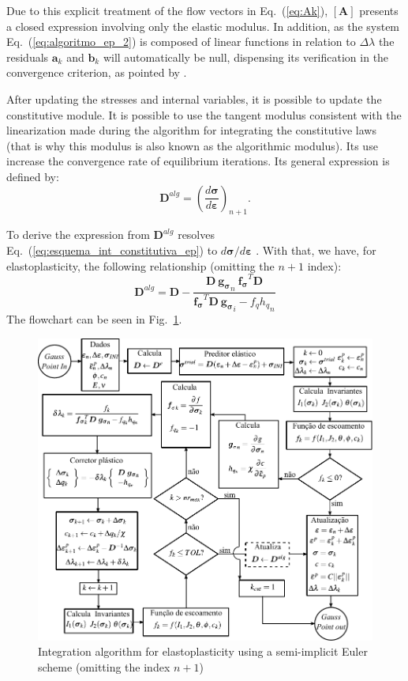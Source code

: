 \documentclass[Journal,letterpaper]{ascelike-new}
\newcommand{\All}{\boldsymbol A}
\newcommand{\al}{\boldsymbol a}
\newcommand{\bl}{\boldsymbol b}
\newcommand{\Dsdee}{\boldsymbol{D}}
\newcommand{\dfds}{\boldsymbol{f_\sigma}}
\newcommand{\hl}{{h_q}}
\newcommand{\dfdq}{{f_q}}
\newcommand{\dgds}{\boldsymbol{g_\sigma}}
\newcommand{\strain}{\boldsymbol{\varepsilon}}
\newcommand{\stress}{\boldsymbol{\sigma}}
\begin{document}
Due to this explicit treatment of the flow vectors in Eq.~(\ref{eq:Ak}), $\left[\All \right]$ presents a closed expression involving only the elastic modulus. In addition, as the system Eq.~(\ref{eq:algoritmo_ep_2}) is composed of linear functions in relation to $\Delta \lambda$ the residuals  $\al_k$ and $\bl_k$ will automatically be null, dispensing its verification in the convergence criterion, as pointed by . 

After updating the stresses and internal variables, it is possible to update the constitutive module. It is possible to use the tangent modulus consistent with the linearization made during the algorithm for integrating the constitutive laws (that is why this modulus is also known as the algorithmic modulus). Its use increase the convergence rate of equilibrium iterations. Its general expression is defined by:
\begin{equation}
	\label{eq:D_alg1}
	\Dsdee^{alg} = \left(\dfrac{d\stress}{d\strain} \right)_{n+1}.
\end{equation}

To derive the expression from $\Dsdee^{alg}$ resolves Eq.~(\ref{eq:esquema_int_constitutiva_ep}) to $d\stress/d\strain$ \cite{belytschko2000}. With that, we have, for elastoplasticity, the following relationship (omitting the $n+1$ index): 
\begin{equation}
	\label{eq:D_alg_ep}
	\Dsdee^{alg} = \Dsdee - \dfrac{\Dsdee~\dgds_n~\dfds^T \Dsdee}{\dfds^T\Dsdee~\dgds_i-\dfdq \hl_n}
\end{equation}
The flowchart can be seen in Fig.~\ref{integração EP semi-implicito}.
\begin{figure}
	\centering
	\includegraphics[scale=1]{integração EP semi-implicito.pdf}
	\caption{Integration algorithm for elastoplasticity using a semi-implicit Euler scheme (omitting the index $n+1$)}
	\label{integração EP semi-implicito}
\end{figure}
\end{document}
